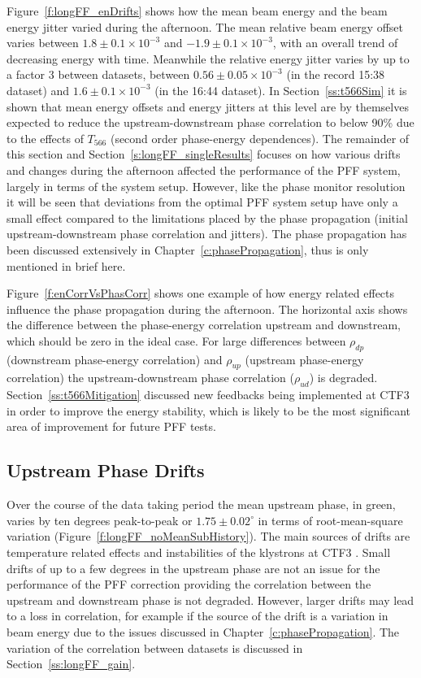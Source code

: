 Figure~\ref{f:longFF_enDrifts} shows how the mean beam energy and the beam energy jitter varied during the afternoon. The mean relative beam energy offset varies between \(1.8\pm0.1\times10^{-3}\) and \(-1.9\pm0.1\times10^{-3}\), with an overall trend of decreasing energy with time. Meanwhile the relative energy jitter varies by up to a factor 3 between datasets, between \(0.56\pm0.05\times10^{-3}\) (in the record 15:38 dataset) and \(1.6\pm0.1\times10^{-3}\) (in the 16:44 dataset). In Section~\ref{ss:t566Sim} it is shown that mean energy offsets and energy jitters at this level are by themselves expected to reduce the upstream-downstream phase correlation to below 90\% due to the effects of \(T_{566}\) (second order phase-energy dependences). The remainder of this section and Section~\ref{s:longFF_singleResults} focuses on how various drifts and changes during the afternoon affected the performance of the PFF system, largely in terms of the system setup. However, like the phase monitor resolution it will be seen that deviations from the optimal PFF system setup have only a small effect compared to the limitations placed by the phase propagation (initial upstream-downstream phase correlation and jitters). The phase propagation has been discussed extensively in Chapter~\ref{c:phasePropagation}, thus is only mentioned in brief here.

Figure~\ref{f:enCorrVsPhasCorr} shows one example of how energy related effects influence the phase propagation during the afternoon.
The horizontal axis shows the difference between the phase-energy correlation upstream and downstream, which should be zero in the ideal case. For large differences between \(\rho_{dp}\) (downstream phase-energy correlation) and \(\rho_{up}\) (upstream phase-energy correlation) the upstream-downstream phase correlation (\(\rho_{ud}\)) is degraded. Section~\ref{ss:t566Mitigation} discussed new feedbacks being implemented at CTF3 in order to improve the energy stability, which is likely to be the most significant area of improvement for future PFF tests.

\subsection{Upstream Phase Drifts}
\label{ss:longFF_upDrifts}

Over the course of the data taking period the mean upstream phase, in green, varies by ten degrees peak-to-peak or \(1.75 \pm 0.02^\circ\) in terms of root-mean-square variation (Figure~\ref{f:longFF_noMeanSubHistory}). The main sources of drifts are temperature related effects and instabilities of the klystrons at CTF3 \cite{lukasIPAC16}. Small drifts of up to a few degrees in the upstream phase are not an issue for the performance of the PFF correction providing the correlation between the upstream and downstream phase is not degraded. However, larger drifts may lead to a loss in correlation, for example if the source of the drift is a variation in beam energy due to the issues discussed in Chapter~\ref{c:phasePropagation}. The variation of the correlation between datasets is discussed in Section~\ref{ss:longFF_gain}.

